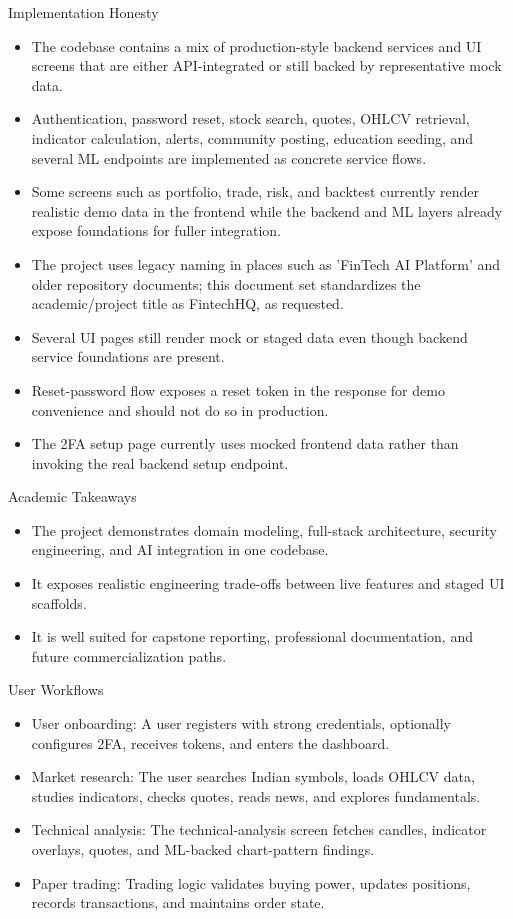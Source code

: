 \documentclass{beamer}
\begin{document}
\begin{frame}{Implementation Honesty}
\begin{itemize}
\item The codebase contains a mix of production-style backend services and UI screens that are either API-integrated or still backed by representative mock data.
\item Authentication, password reset, stock search, quotes, OHLCV retrieval, indicator calculation, alerts, community posting, education seeding, and several ML endpoints are implemented as concrete service flows.
\item Some screens such as portfolio, trade, risk, and backtest currently render realistic demo data in the frontend while the backend and ML layers already expose foundations for fuller integration.
\item The project uses legacy naming in places such as 'FinTech AI Platform' and older repository documents; this document set standardizes the academic/project title as FintechHQ, as requested.
\item Several UI pages still render mock or staged data even though backend service foundations are present.
\item Reset-password flow exposes a reset token in the response for demo convenience and should not do so in production.
\item The 2FA setup page currently uses mocked frontend data rather than invoking the real backend setup endpoint.
\end{itemize}
\end{frame}
\begin{frame}{Academic Takeaways}
\begin{itemize}
\item The project demonstrates domain modeling, full-stack architecture, security engineering, and AI integration in one codebase.
\item It exposes realistic engineering trade-offs between live features and staged UI scaffolds.
\item It is well suited for capstone reporting, professional documentation, and future commercialization paths.
\end{itemize}
\end{frame}
\begin{frame}{User Workflows}
\begin{itemize}
\item User onboarding: A user registers with strong credentials, optionally configures 2FA, receives tokens, and enters the dashboard.
\item Market research: The user searches Indian symbols, loads OHLCV data, studies indicators, checks quotes, reads news, and explores fundamentals.
\item Technical analysis: The technical-analysis screen fetches candles, indicator overlays, quotes, and ML-backed chart-pattern findings.
\item Paper trading: Trading logic validates buying power, updates positions, records transactions, and maintains order state.
\end{itemize}
\end{frame}
\end{document}
